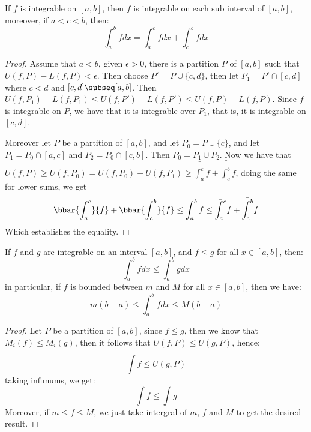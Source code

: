 \begin{theorem}\label{5.2.3}
    If $f$ is integrable on  $[a,b]$, then  $f$ is integrable on each sub
    interval of  $[a,b]$, moreover, if  $a<c<b$, then:
        \begin{equation}
            \int_{a}^{b}{f dx}=\int_{a}^{c}{f dx}+\int_{c}^{b}{f dx}
        \end{equation}
\end{theorem}
\begin{proof}
    Assume that $a<b$, given  $\epsilon>0$, there is a partition  $P$ of
    $[a,b]$ such that  $U(f,P)-L(f,P)<\epsilon$. Then choose  $P'=P \cup
    \{c,d\}$, then let  $P_1=P' \cap [c,d]$ where $c<d$ and  $[c,d] \subseq
    [a,b]$. Then $U(f,P_1)-L(f,P_1) \leq U(f,P')-L(f,P') \leq U(f,P)-L(f,P)$.
    Since $f$ is integrable on  $P$, we have that it is integrable over  $ P_1$,
    that is, it is integrable on $[c,d]$.

    Moreover let  $P$ be a partition of  $[a,b]$, and let  $ P_0=P \cup \{c\}$,
    and let $ P_1=P_0 \cap [a,c]$ and $ P_2=P_0 \cap [c,b]$. Then $ P_0=P_1 \cup
    P_2$. Now we have that $U(f,P) \geq
    U(f,P_0)=U(f,P_0)+U(f,P_1) \geq
    \bar{\int_{a}^{c}}{f}+\bar{\int_{c}^{b}}{f}$, doing the same for lower
    sums, we get
        \begin{equation*}
            \bbar{\int_{a}^{c}}{f}+\bbar{\int_{c}^{b}}{f} \leq
            \int_{a}^{b}{f} \leq
            \bar{\int_{a}^{c}}{f}+\bar{\int_{c}^{b}}{f}
        \end{equation*}
    Which establishes the equality.
\end{proof}

\begin{theorem}\label{5.2.4}
    If $f$ and  $g$ are integrable on an interval  $[a,b]$, and  $f \leq g$ for all  $x \in [a,b]$,
    then: 
        \begin{equation}
            \int_{a}^{b}{f} dx \leq \int_{a}^{b}{g} dx
        \end{equation}
        in particular, if $f$ is bounded between  $m$ and  $M$ for all  $x \in [a,b]$, then we
        have:
        \begin{equation}
            m(b-a) \leq \int_{a}^{b}{f} dx \leq M(b-a)
        \end{equation} 
\end{theorem}
\begin{proof}
    Let $P$ be a partition of  $[a,b]$, since  $f \leq g$, then we know that  $M_i(f) \leq
    M_i(g)$, then it follows that  $U(f,P) \leq U(g,P)$, hence:
        \begin{equation*}    
            \bar{\int}{f} \leq U(g,P)
        \end{equation*}
    taking infimums, we get:
        \begin{equation*}
            \int{f} \leq \int{g}
        \end{equation*}
    Moreover, if $m \leq f \leq M$, we just take intergral of  $m$, $f$ and $M$ to get the desired
    result.
\end{proof}

